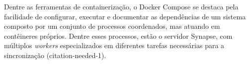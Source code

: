 	Dentre as ferramentas de containerização, o Docker Compose se destaca pela facilidade de configurar, executar e documentar as dependências de um sistema composto por um conjunto de processos coordenados, mas atuando em contêineres próprios. Dentre esses processos, estão o servidor Synapse, com múltiplos \textit{workers} especializados em diferentes tarefas necessárias para a sincronização (citation-needed-1).
	

